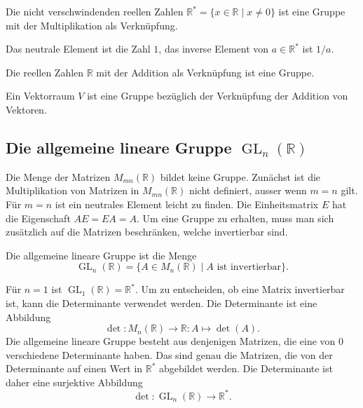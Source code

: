 \begin{beispiel}
Die nicht verschwindenden reellen Zahlen
$\mathbb R^*=\{x\in\mathbb R\;|\; x\ne 0\}$
ist eine Gruppe mit der Multiplikation als Verknüpfung.

\smallskip

{\parindent0pt Das neutrale} Element ist die Zahl $1$, das inverse Element
von $a\in\mathbb R^*$ ist $1/a$.
\end{beispiel}

\begin{beispiel}
Die reellen Zahlen $\mathbb R$ mit der Addition als Verknüpfung ist eine
Gruppe.
\end{beispiel}

\begin{beispiel}
Ein Vektorraum $V$ ist eine Gruppe bezüglich der Verknüpfung der Addition
von Vektoren.
\end{beispiel}

%
%
\subsection{Die allgemeine lineare Gruppe $\operatorname{GL}_n(\mathbb R)$}
Die Menge der Matrizen $M_{mn}(\mathbb R)$ bildet keine Gruppe.
Zunächst ist die Multiplikation von Matrizen in $M_{mn}(\mathbb R)$
nicht definiert, ausser wenn $m=n$ gilt.
Für $m=n$ ist ein neutrales Element leicht zu finden.
Die Einheitsmatrix $E$ hat die Eigenschaft $AE=EA=A$.
Um eine Gruppe zu erhalten, muss man sich zusätzlich auf die 
Matrizen beschränken, welche invertierbar sind.

\begin{definition}
Die allgemeine lineare Gruppe ist die Menge
\[
\operatorname{GL}_n(\mathbb R)
=
\{ A\in M_n(\mathbb R)\;|\; \text{$A$ ist invertierbar}\}.
\]
\end{definition}

Für $n=1$ ist $\operatorname{GL}_1(\mathbb R) = \mathbb R^*$.
Um zu entscheiden, ob eine Matrix invertierbar ist, kann die Determinante
verwendet werden.
Die Determinante ist eine Abbildung
\[
\det
\colon
M_n(\mathbb R) \to \mathbb R
:
A \mapsto \det(A).
\]
Die allgemeine lineare Gruppe besteht aus denjenigen Matrizen,
die eine von $0$ verschiedene Determinante haben.
Das sind genau die Matrizen, die von der Determinante
auf einen Wert in $\mathbb R^*$ abgebildet werden.
Die Determinante ist daher eine surjektive Abbildung
\[
\det
\colon
\operatorname{GL}_n(\mathbb R)
\to
\mathbb R^*.
\]


